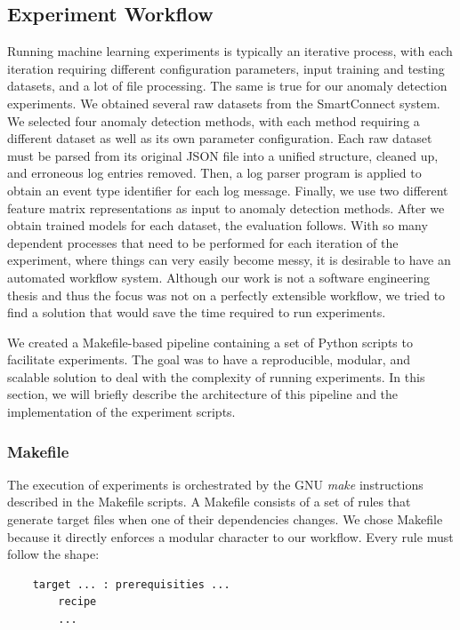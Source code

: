 \subsection{Experiment Workflow}
Running machine learning experiments is typically an iterative process, with each iteration requiring different configuration parameters, input training and testing datasets, and a lot of file processing. The same is true for our anomaly detection experiments. We obtained several raw datasets from the SmartConnect system. We selected four anomaly detection methods, with each method requiring a different dataset as well as its own parameter configuration. Each raw dataset must be parsed from its original JSON file into a unified structure, cleaned up, and erroneous log entries removed. Then, a log parser program is applied to obtain an event type identifier for each log message. Finally, we use two different feature matrix representations as input to anomaly detection methods. After we obtain trained models for each dataset, the evaluation follows. With so many dependent processes that need to be performed for each iteration of the experiment, where things can very easily become messy, it is desirable to have an automated workflow system. Although our work is not a software engineering thesis and thus the focus was not on a perfectly extensible workflow, we tried to find a solution that would save the time required to run experiments.

We created a Makefile-based pipeline containing a set of Python scripts to facilitate experiments. The goal was to have a reproducible, modular, and scalable solution to deal with the complexity of running experiments. In this section, we will briefly describe the architecture of this pipeline and the implementation of the experiment scripts.
 
 \subsubsection*{Makefile}
The execution of experiments is orchestrated by the GNU \textit{make} instructions described in the Makefile scripts. A Makefile consists of a set of rules that generate target files when one of their dependencies changes. We chose Makefile because it directly enforces a modular character to our workflow. Every rule must follow the shape:

\begin{verbatim}
    target ... : prerequisities ... 
        recipe
        ...
\end{verbatim}

